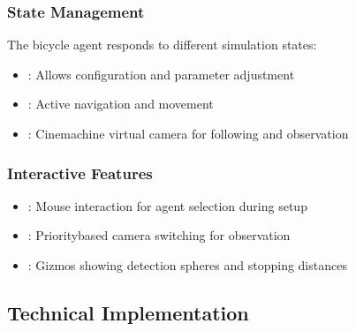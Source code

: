 \documentclass[letterpaper,10pt,english]{jupyterBook}
\begin{document}
\subsubsection{State Management}
\label{\detokenize{Bicycle Agent:state-management}}
\sphinxAtStartPar
The bicycle agent responds to different simulation states:
\begin{itemize}
\item {} 
\sphinxAtStartPar
{}: Allows configuration and parameter adjustment

\item {} 
\sphinxAtStartPar
{}: Active navigation and movement

\item {} 
\sphinxAtStartPar
{}: Cinemachine virtual camera for following and observation

\end{itemize}


\subsubsection{Interactive Features}
\label{\detokenize{Bicycle Agent:interactive-features}}\begin{itemize}
\item {} 
\sphinxAtStartPar
{}: Mouse interaction for agent selection during setup

\item {} 
\sphinxAtStartPar
{}: Priority\sphinxhyphen{}based camera switching for observation

\item {} 
\sphinxAtStartPar
{}: Gizmos showing detection spheres and stopping distances

\end{itemize}


\subsection{Technical Implementation}
\label{\detokenize{Bicycle Agent:technical-implementation}}
\end{document}
